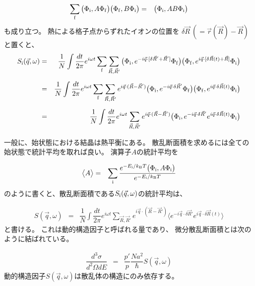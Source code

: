 \documentclass[a4j]{jsarticle}
\begin{document}
\begin{eqnarray}
	\sum_{\rm f}
	\big( \Phi_{\rm i} , A \Phi_{\rm f} \big)
	\big( \Phi_{\rm f} , B \Phi_{\rm i} \big)
	&=&
	\big( \Phi_{\rm i} , AB \Phi_{\rm i} \big)
\end{eqnarray}
も成り立つ。
熱による格子点からずれたイオンの位置を
$\delta \vec{R} \ (= \vec{r}(\vec{R}) - \vec{R} )$
と置くと、
\begin{eqnarray}
	S_{\rm i}(\vec{q},\omega)
	&=&
	\dfrac{1}{N}
	\int \dfrac{ dt }{ 2 \pi }
	e^{ i \omega t }
	\sum_{\rm f}
	\sum_{\vec{R},\vec{R}'}
	\big( \Phi_{\rm i} , e^{ - i \vec{q} \cdot [ \delta \vec{R}' + \vec{R}' ]  } \Phi_{\rm f} \big)
	\big( \Phi_{\rm f} , e^{i \vec{q} \cdot [ \delta \vec{R}(t) + \vec{R} ] } \Phi_{\rm i} \big)
	\nonumber \\[2mm] &=&
	\dfrac{1}{N}
	\int \dfrac{ dt }{ 2 \pi }
	e^{ i \omega t }
	\sum_{\rm f}
	\sum_{\vec{R},\vec{R}'}
	e^{ i \vec{q} \cdot (\vec{R} - \vec{R}')}
	\big( \Phi_{\rm i} , e^{ - i \vec{q} \cdot \delta \vec{R}' } \Phi_{\rm f} \big)
	\big( \Phi_{\rm f} , e^{i \vec{q} \cdot \delta \vec{R}(t) } \Phi_{\rm i} \big)
	\nonumber \\[2mm] &=&
	\dfrac{1}{N}
	\int \dfrac{ dt }{ 2 \pi }
	e^{ i \omega t }
	\sum_{\vec{R},\vec{R}'}
	e^{ i \vec{q} \cdot (\vec{R} - \vec{R}')}
	\big( \Phi_{\rm i} , e^{ - i \vec{q} \cdot \delta \vec{R}' } e^{i \vec{q} \cdot \delta \vec{R}(t) } \Phi_{\rm i} \big)
\end{eqnarray}

一般に、始状態における結晶は熱平衡にある。
散乱断面積を求めるには全ての始状態で統計平均を取れば良い。
演算子$A$の統計平均を


\begin{eqnarray}
	\big\langle A \big\rangle
	&=&
	\sum_{\rm i}
	\dfrac{ e^{ - E_{\rm i} / k_{\rm B} T } \big( \Phi_{\rm i} , A \Phi_{\rm i} \big) }{e^{ - E_{\rm i} / k_{\rm B} T }}
\end{eqnarray}
のように書くと、散乱断面積である$S_{\rm i}(\vec{q},\omega)$の統計平均は、


\begin{eqnarray}
	S(\vec{q},\omega)
	&=&
	\dfrac{1}{N}
	\int \dfrac{ dt }{ 2 \pi }
	e^{ i \omega t }
	\sum_{\vec{R},\vec{R}'}
	e^{ i \vec{q} \cdot (\vec{R} - \vec{R}')}
	\big\langle e^{ - i \vec{q} \cdot \delta \vec{R}' } e^{i \vec{q} \cdot \delta \vec{R}(t) } \big\rangle
\end{eqnarray}
と書ける。
これは動的構造因子と呼ばれる量であり、
微分散乱断面積とは次のように結ばれている。


\begin{eqnarray}
	\dfrac{ d^{3} \sigma }{ d^{2} \Omega d E }
	&=&
	\dfrac{p'}{p}
	\dfrac{ N a^{2} }{ \hbar }
	S(\vec{q},\omega)
\end{eqnarray}
動的構造因子$S(\vec{q},\omega)$は散乱体の構造にのみ依存する。
\end{document}
